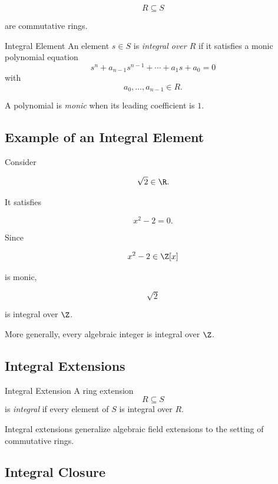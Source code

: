 \[ R\subseteq S \]

are commutative rings.

\begin{definitionbox}{Integral Element}
An element \(s\in S\) is \emph{integral over \(R\)} if it satisfies a monic
polynomial equation
\[ s^n+a_{n-1}s^{n-1}+\cdots+a_1s+a_0=0 \]
with
\[ a_0,\ldots,a_{n-1}\in R. \]
\end{definitionbox}

A polynomial is \emph{monic} when its leading coefficient is \(1\).

\subsection{Example of an Integral Element}
\label{subsec:integral-element-example}

Consider

\[ \sqrt{2}\in\R. \]

It satisfies

\[ x^2-2=0. \]

Since

\[ x^2-2\in\Z[x] \]

is monic,

\[ \sqrt{2} \]

is integral over \(\Z\).

More generally, every algebraic integer is integral over \(\Z\).

\subsection{Integral Extensions}
\label{subsec:integral-extensions}

\begin{definitionbox}{Integral Extension}
A ring extension
\[ R\subseteq S \]
is \emph{integral} if every element of \(S\) is integral over \(R\).
\end{definitionbox}

Integral extensions generalize algebraic field extensions to the setting of
commutative rings.

\subsection{Integral Closure}
\label{subsec:integral-closure}

